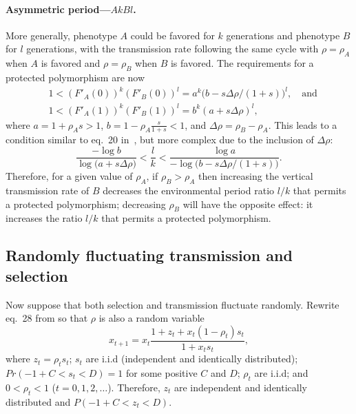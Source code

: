 \documentclass[14pt]{extarticle}
\begin{document}
\paragraph{Asymmetric period---$AkBl$.}
More generally, phenotype $A$ could be favored for $k$ generations and phenotype $B$ for $l$ generations, with the transmission rate following the same cycle with $\rho=\rho_A$ when $A$ is favored and $\rho=\rho_B$ when $B$ is favored.
The requirements for a protected polymorphism are now
\begin{equation}\begin{aligned}
& 1 < (F'_A(0))^k (F'_B(0))^l = a^k \big(b - s \Delta \rho /(1+s)\big)^l, \quad \text{and} \\
& 1 < (F'_A(1))^k (F'_B(1))^l = b^k (a + s \Delta \rho)^l,
\end{aligned}\end{equation}
where $a=1+\rho_A s>1$, $b=1-\rho_A\frac{s}{1+s}<1$, and $\Delta \rho = \rho_B - \rho_A$.
This leads to a condition similar to eq.~20 in~\citet{Ram2018}, but more complex due to the inclusion of $\Delta \rho$:
\begin{equation} \label{eq:poly_condition_periodic_fluc_k_l}
\frac{-\log{b}}{\log{\big(a + s \Delta \rho \big)}} < 
\frac{l}{k} < 
\frac{\log{a}}{-\log{\big(b - s \Delta \rho/(1+s)\big)}}.
\end{equation}
Therefore, for a given value of $\rho_A$, if $\rho_B>\rho_A$ then increasing the vertical transmission rate of $B$ decreases the environmental period ratio $l/k$ that permits a protected polymorphism; decreasing $\rho_B$  will have the opposite effect: it increases the ratio $l/k$ that permits a protected polymorphism.

\subsection*{Randomly fluctuating transmission and selection}

Now suppose that both selection and transmission fluctuate randomly.
Rewrite eq.~28 from \citet{Ram2018} so that $\rho$ is also a random variable
\begin{equation}
x_{t+1} = x_t \frac{1 + z_t + x_t (1 - \rho_t) s_t}{1 + x_t s_t},
\end{equation}
where $z_t=\rho_t s_t$; $s_t$ are i.i.d (independent and identically distributed); $Pr(-1+C<s_t<D)=1$ for some positive $C$ and $D$; $\rho_t$ are i.i.d; and  $0<\rho_t<1$ ($t=0,1,2,\ldots$).
Therefore, $z_t$ are independent and identically distributed and $P(-1+C < z_t < D)$. 
\end{document}
